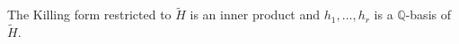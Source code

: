 The Killing form restricted to $\tilde{H}$ is an inner product and
$h_1, \ldots, h_r$ is a $\mathbb{Q}$-basis of $\tilde{H}$.

